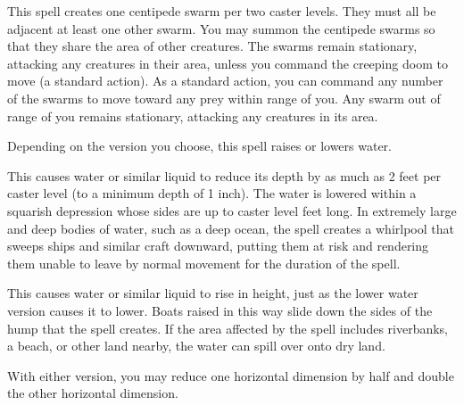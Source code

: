\begin{spellheader}
    \spellrng{\rngmed}
\end{spellheader}
\begin{spellcontent}
    \spelleffect This spell creates one centipede swarm per two caster levels. They must all be adjacent at least one other swarm. You may summon the centipede swarms so that they share the area of other creatures. The swarms remain stationary, attacking any creatures in their area, unless you command the creeping doom to move (a standard action). As a standard action, you can command any number of the swarms to move toward any prey within range of you. Any swarm out of range of you remains stationary, attacking any creatures in its area.
    \spelldur{\durmed}
\end{spellcontent}
\begin{spellfooter}
\end{spellfooter}

\begin{spellheader}
\end{spellheader}
\begin{spellcontent}
    \begin{spelltargetinginfo}
    \end{spelltargetinginfo}
    \begin{spelleffects}
        \spelleffect Depending on the version you choose, this spell raises or lowers water.
        \par {} This causes water or similar liquid to reduce its depth by as much as 2 feet per caster level (to a minimum depth of 1 inch). The water is lowered within a squarish depression whose sides are up to caster level  feet long. In extremely large and deep bodies of water, such as a deep ocean, the spell creates a whirlpool that sweeps ships and similar craft downward, putting them at risk and rendering them unable to leave by normal movement for the duration of the spell.
        \par {} This causes water or similar liquid to rise in height, just as the lower water version causes it to lower. Boats raised in this way slide down the sides of the hump that the spell creates. If the area affected by the spell includes riverbanks, a beach, or other land nearby, the water can spill over onto dry land.
        \spelldur{\durmed \dismissable}
    \end{spelleffects}
\end{spellcontent}
\begin{spellfooter}
    \spellnotes With either version, you may reduce one horizontal dimension by half and double the other horizontal dimension.
\end{spellfooter}



